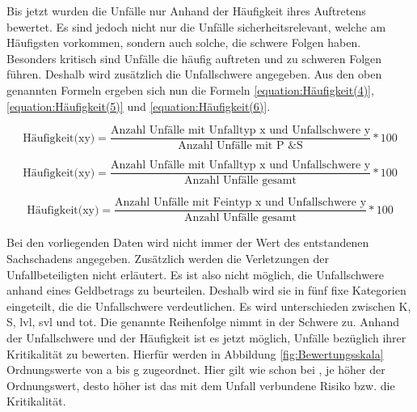 Bis jetzt wurden die Unfälle nur Anhand der Häufigkeit ihres Auftretens bewertet. Es sind jedoch nicht nur die Unfälle sicherheitsrelevant, welche am Häufigsten vorkommen, sondern auch solche, die schwere Folgen haben. Besonders kritisch sind Unfälle die häufig auftreten und zu schweren Folgen führen. Deshalb wird zusätzlich die Unfallschwere angegeben. Aus den oben genannten Formeln ergeben sich nun die Formeln \ref{equation:Häufigkeit(4)}, \ref{equation:Häufigkeit(5)} und \ref{equation:Häufigkeit(6)}.

\begin{equation}\label{equation:Häufigkeit(4)}
\text{Häufigkeit(xy)} = \dfrac{\text{Anzahl Unfälle mit Unfalltyp x und Unfallschwere y}}{\text{Anzahl Unfälle mit P \& S}}*100
\end{equation}

\begin{equation}\label{equation:Häufigkeit(5)}
\text{Häufigkeit(xy)} = \dfrac{\text{Anzahl Unfälle mit Unfalltyp x und Unfallschwere y}}{\text{Anzahl Unfälle gesamt}}*100
\end{equation}

\begin{equation}\label{equation:Häufigkeit(6)}
\text{Häufigkeit(xy)} = \dfrac{\text{Anzahl Unfälle mit Feintyp x und Unfallschwere y}}{\text{Anzahl Unfälle gesamt}}*100
\end{equation}

Bei den vorliegenden Daten wird nicht immer der Wert des entstandenen Sachschadens angegeben. Zusätzlich werden die Verletzungen der Unfallbeteiligten nicht erläutert. Es ist also nicht möglich, die Unfallschwere anhand eines Geldbetrags zu beurteilen. Deshalb wird sie in fünf fixe Kategorien eingeteilt, die die Unfallschwere verdeutlichen. Es wird unterschieden zwischen \ac{K}, \ac{S}, \ac{lvl}, \ac{svl} und \ac{tot}. Die genannte Reihenfolge nimmt in der Schwere zu. Anhand der Unfallschwere und der Häufigkeit ist es jetzt möglich, Unfälle bezüglich ihrer Kritikalität zu bewerten. Hierfür werden in Abbildung \ref{fig:Bewertungsskala} Ordnungswerte von a bis g zugeordnet. Hier gilt wie schon bei \Textcite[S. 50f]{Hillenbrand.2012}, je höher der Ordnungswert, desto höher ist das mit dem Unfall verbundene Risiko bzw. die Kritikalität. 

